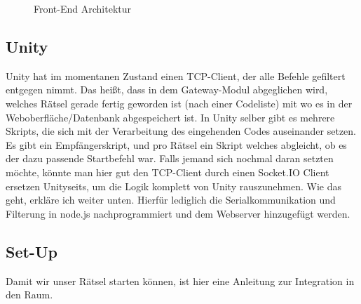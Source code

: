 \documentclass[12pt]{article} %
\begin{document}
\begin{figure}[H]
	\caption{Front-End Architektur}
	\label{fig:archFrontend}
  \end{figure}


\subsection{Unity} %

Unity hat im momentanen Zustand einen TCP-Client, der alle Befehle gefiltert entgegen nimmt. 
Das heißt, dass in dem Gateway-Modul abgeglichen wird, welches Rätsel gerade fertig geworden ist (nach einer Codeliste) mit wo es in der Weboberfläche/Datenbank abgespeichert ist.
In Unity selber gibt es mehrere Skripts, die sich mit der Verarbeitung des eingehenden Codes auseinander setzen. 
Es gibt ein Empfängerskript, und pro Rätsel ein Skript welches abgleicht, ob es der dazu passende Startbefehl war.
Falls jemand sich nochmal daran setzten möchte, könnte man hier gut den TCP-Client durch einen Socket.IO Client ersetzen Unityseits, um die Logik komplett von Unity rauszunehmen.
Wie das geht, erkläre ich weiter unten.
Hierfür lediglich die Serialkommunikation und Filterung in node.js nachprogrammiert und dem Webserver hinzugefügt werden.


\subsection{Set-Up} %
Damit wir unser Rätsel starten können, ist hier eine Anleitung zur Integration in den Raum.
\end{document}
